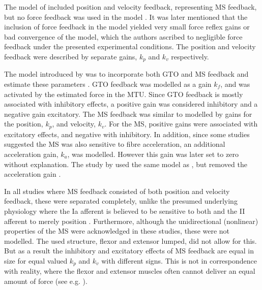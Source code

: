 The model of \citeauthor{van_der_helm_identification_2002} included position and velocity feedback, representing MS feedback, but no force feedback was used in the model \cite{van_der_helm_identification_2002}. It was later mentioned that the inclusion of force feedback in the model yielded very small force reflex gains or bad convergence of the model, which the authors ascribed to negligible force feedback under the presented experimental conditions. The position and velocity feedback were described by separate gains, $k_p$ and $k_v$ respectively. 

The model introduced by \citeauthor{schouten_nmclab_2008} was  to incorporate both GTO and MS feedback and estimate these parameters \cite{schouten_nmclab_2008}. GTO feedback was modelled as a gain $k_f$, and was activated by the estimated force in the MTU. Since GTO feedback is mostly associated with inhibitory effects, a positive gain was considered inhibitory and a negative gain excitatory. The MS feedback was similar to \citeauthor{van_der_helm_identification_2002} modelled by gains for the position, $k_p$, and velocity, $k_v$. For the MS, positive gains were associated with excitatory effects, and negative with inhibitory. In addition, since some studies suggested the MS was also sensitive to fibre acceleration, an additional acceleration gain, $k_a$, was modelled. However this gain was later set to zero without explanation. The study by \citeauthor{mugge_rigorous_2010} used the same model as \citeauthor{schouten_nmclab_2008}, but removed the acceleration gain \cite{mugge_rigorous_2010}.

In all studies where MS feedback consisted of both position and velocity feedback, these were separated completely, unlike the presumed underlying physiology where the Ia afferent is believed to be sensitive to both and the II afferent to merely position \cite{van_der_helm_identification_2002, schouten_nmclab_2008, mugge_rigorous_2010}. Furthermore, although the unidirectional (nonlinear) properties of the MS were acknowledged in these studies, these were not modelled. The used structure, flexor and extensor lumped, did not allow for this. But as a result the inhibitory and excitatory effects of MS feedback are equal in size for equal valued $k_p$ and $k_v$ with different signs. This is not in correspondence with reality, where the flexor and extensor muscles often cannot deliver an equal amount of force (see e.g. \cite{winters_analysis_1985}). 



